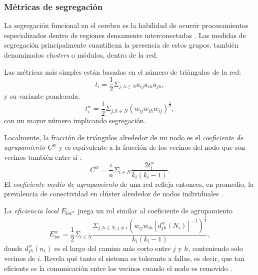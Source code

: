\subsubsection{Métricas de segregación}
La segregación funcional en el cerebro es la habilidad de ocurrir procesamientos especializados dentro de regiones densamente interconectadas \parencite{Tononi1994}.
Las medidas de segregación principalmente cuantifican la presencia de estos grupos, también denominados \textit{clusters} o módulos, dentro de la red. \par
Las métricas más simples están basadas en el número de triángulos de la red:
\begin{equation}\label{eqTriangles1}
    t_i=\frac{1}{2}\Sigma_{j,h \in N}a_{ij}a_{ih}a_{jh},
\end{equation}
y su variante ponderada:
\begin{equation}\label{eqTriangles2}
    t_i^w=\frac{1}{2}\Sigma_{j,h \in N}(w_{ij}w_{ih}w_{ij})^{\frac{1}{3}},
\end{equation}
con un mayor número implicando segregación.\par
Localmente, la fracción de triángulos alrededor de un nodo es el \emph{coeficiente de agrupamiento} $C^w$ y es equivalente a la fracción de los vecinos del nodo que son vecinos también entre sí \parencite{Watts1998,Onnela2005}:
\begin{equation}\label{eqClusterCoeff}
    C^w=\frac{i}{n}\Sigma_{i \in N}\frac{2t_i^w}{k_i(k_i-1)}.
\end{equation}
El \emph{coeficiente medio de agrupamiento} de una red refleja entonces, en promedio, la prevalencia de conectividad en clúster alrededor de nodos individuales \parencite{Rubinov2010}. \par
La \emph{eficiencia local} $E_{\text{loc}^w}$ juega un rol similar al coeficiente de agrupamiento
\begin{equation}\label{eqEloc}
    E_{\text{loc}}^w=\frac{1}{2}\Sigma_{i \in N}\frac{\Sigma_{j,h \in N, j \neq i}(w_{ij}w_{ih}[d_{jh}^w(N_i)]^{-1})^\frac{1}{3}}{k_i(k_i-1)},
\end{equation}
donde $d_{jh}^w(n_i)$ es el largo del camino más corto entre $j$ y $h$, conteniendo solo vecinos de $i$. Revela qué tanto el sistema es tolerante a fallas, es decir, que tan eficiente es la comunicación entre los vecinos cuando el nodo es removido \parencite{Latora2001}.

